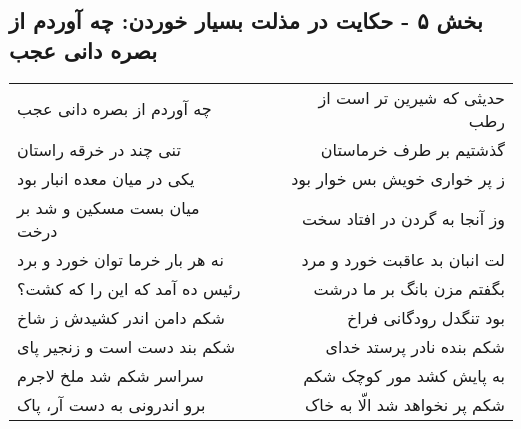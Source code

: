 \begin{center}
\section*{بخش ۵ - حکایت در مذلت بسیار خوردن: چه آوردم از بصره دانی عجب}
\label{sec:005}
\begin{longtable}{l p{0.5cm} r}
چه آوردم از بصره دانی عجب
&&
حدیثی که شیرین تر است از رطب
\\
تنی چند در خرقه راستان
&&
گذشتیم بر طرف خرماستان
\\
یکی در میان معده انبار بود
&&
ز پر خواری خویش بس خوار بود
\\
میان بست مسکین و شد بر درخت
&&
وز آنجا به گردن در افتاد سخت
\\
نه هر بار خرما توان خورد و برد
&&
لت انبان بد عاقبت خورد و مرد
\\
رئیس ده آمد که این را که کشت؟
&&
بگفتم مزن بانگ بر ما درشت
\\
شکم دامن اندر کشیدش ز شاخ
&&
بود تنگدل رودگانی فراخ
\\
شکم بند دست است و زنجیر پای
&&
شکم بنده نادر پرستد خدای
\\
سراسر شکم شد ملخ لاجرم
&&
به پایش کشد مور کوچک شکم
\\
برو اندرونی به دست آر، پاک
&&
شکم پر نخواهد شد الّا به خاک
\\
\end{longtable}
\end{center}
